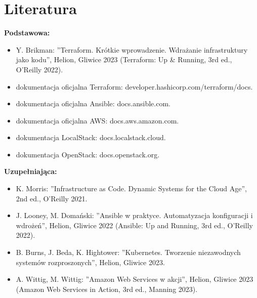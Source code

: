 \documentclass[12pt, a4paper]{article}
\begin{document}
\section{Literatura}

\textbf{Podstawowa:}
\begin{itemize}
  \item Y. Brikman: ''Terraform. Krótkie wprowadzenie. Wdrażanie infrastruktury jako kodu'', Helion, Gliwice 2023 (Terraform: Up \& Running, 3rd ed., O'Reilly 2022).
  \item dokumentacja oficjalna Terraform: developer.hashicorp.com/terraform/docs.
  \item dokumentacja oficjalna Ansible: docs.ansible.com.
  \item dokumentacja oficjalna AWS: docs.aws.amazon.com.
  \item dokumentacja LocalStack: docs.localstack.cloud.
  \item dokumentacja OpenStack: docs.openstack.org.
\end{itemize}

\textbf{Uzupełniająca:}
\begin{itemize}
  \item K. Morris: ''Infrastructure as Code. Dynamic Systems for the Cloud Age'', 2nd ed., O'Reilly 2021.
  \item J. Looney, M. Domański: ''Ansible w praktyce. Automatyzacja konfiguracji i wdrożeń'', Helion, Gliwice 2022 (Ansible: Up and Running, 3rd ed., O'Reilly 2022).
  \item B. Burns, J. Beda, K. Hightower: ''Kubernetes. Tworzenie niezawodnych systemów rozproszonych'', Helion, Gliwice 2023.
  \item A. Wittig, M. Wittig: ''Amazon Web Services w akcji'', Helion, Gliwice 2023 (Amazon Web Services in Action, 3rd ed., Manning 2023).
\end{itemize}
\end{document}
